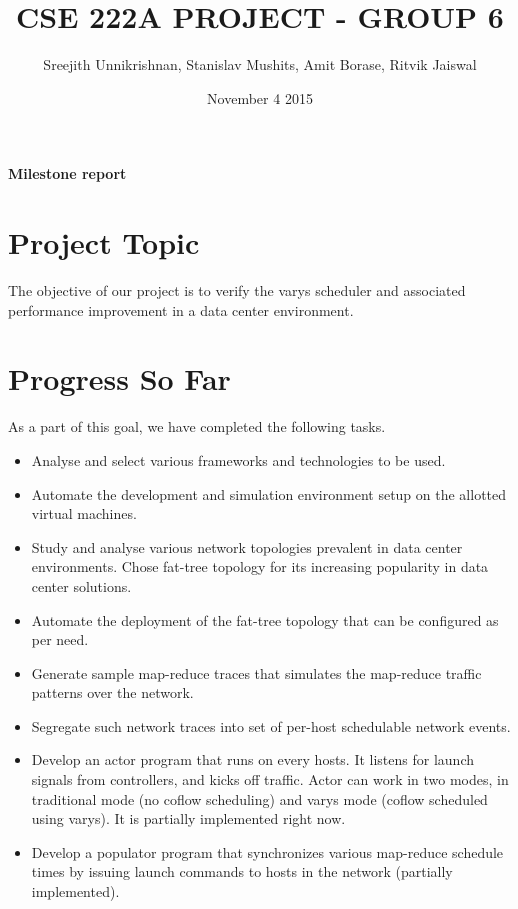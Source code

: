 \documentclass{article}
\title{CSE 222A PROJECT - GROUP 6}
\author{Sreejith Unnikrishnan, Stanislav Mushits, Amit Borase, Ritvik Jaiswal }
\date{November 4 2015}
\begin{document}
\maketitle

\begin{center}
\textbf{Milestone report}
\end{center}


\section{Project Topic}
The objective of our project is to verify the varys scheduler\cite{varys} and associated performance improvement in a data center environment. 

\section{Progress So Far}
As a part of this goal, we have completed the following tasks.

\begin{itemize}
\item Analyse and select various frameworks and technologies to be used.
\item Automate the development and simulation environment setup on the allotted virtual machines.
\item Study and analyse various network topologies prevalent in data center environments. Chose fat-tree topology for its increasing popularity in data center solutions.
\item Automate the deployment of the fat-tree topology that can be configured as per need.
\item Generate sample map-reduce traces that simulates the map-reduce traffic patterns over the network.
\item Segregate such network traces into set of per-host schedulable network events.
\item  Develop an actor program that runs on every hosts. It listens for launch signals from controllers, and kicks off traffic. Actor can work in two modes, in traditional mode (no coflow scheduling) and varys mode (coflow scheduled using varys). It is partially implemented right now.
\item Develop a populator program that synchronizes various map-reduce schedule times by issuing launch commands to hosts in the network (partially implemented).

\end{itemize}
\end{document}
